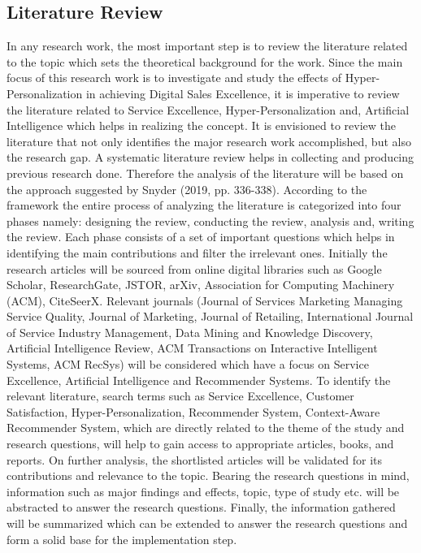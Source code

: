  \subsection{Literature Review}
 In any research work, the most important step is to review the literature related to the topic which sets the theoretical background for the work.  Since the main focus of this research work is to investigate and study the effects of Hyper-Personalization in achieving Digital Sales Excellence, it is imperative to review the literature related to Service Excellence, Hyper-Personalization and, Artificial Intelligence which helps in realizing the concept. It is envisioned to review the literature that not only identifies the major research work accomplished, but also the research gap.  A systematic literature review helps in collecting and producing previous research done. Therefore the analysis of the literature will be based on the approach suggested by Snyder (2019, pp. 336-338). According to the framework the entire process of analyzing the literature is categorized into four phases namely: designing the review, conducting the review, analysis and, writing the review. Each phase consists of a set of important questions which helps in identifying the main contributions and filter the irrelevant ones. 
Initially the research articles will be sourced from online digital libraries such as Google Scholar, ResearchGate, JSTOR, arXiv, Association for Computing Machinery (ACM), CiteSeerX.  Relevant journals (Journal of Services Marketing Managing Service Quality, Journal of Marketing, Journal of Retailing, International Journal of Service Industry Management, Data Mining and Knowledge Discovery, Artificial Intelligence Review, ACM Transactions on Interactive Intelligent Systems, ACM RecSys) will be considered which have a focus on Service Excellence, Artificial Intelligence and Recommender Systems. To identify the relevant literature, search terms such as Service Excellence, Customer Satisfaction, Hyper-Personalization, Recommender System, Context-Aware Recommender System, which are directly related to the theme of the study and research questions, will help to gain access to appropriate articles, books, and reports. On further analysis, the shortlisted articles will be validated for its contributions and relevance to the topic. Bearing the research questions in mind, information such as major findings and effects, topic, type of study etc. will be abstracted to answer the research questions. Finally, the information gathered will be summarized which can be extended to answer the research questions and form a solid base for the implementation step.
